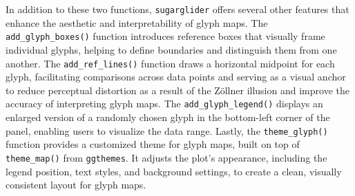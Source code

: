 In addition to these two functions, \texttt{sugarglider} offers several other features that enhance the aesthetic and interpretability of glyph maps. The \texttt{add\_glyph\_boxes()} function introduces reference boxes that visually frame individual glyphs, helping to define boundaries and distinguish them from one another. The \texttt{add\_ref\_lines()} function draws a horizontal midpoint for each glyph, facilitating comparisons across data points and serving as a visual anchor to reduce perceptual distortion as a result of the Zöllner illusion and improve the accuracy of interpreting glyph maps. The \texttt{add\_glyph\_legend()} displays an enlarged version of a randomly chosen glyph in the bottom-left corner of the panel, enabling users to visualize the data range. Lastly, the \texttt{theme\_glyph()} function provides a customized theme for glyph maps, built on top of \texttt{theme\_map()} from \texttt{ggthemes}. It adjusts the plot's appearance, including the legend position, text styles, and background settings, to create a clean, visually consistent layout for glyph maps.

